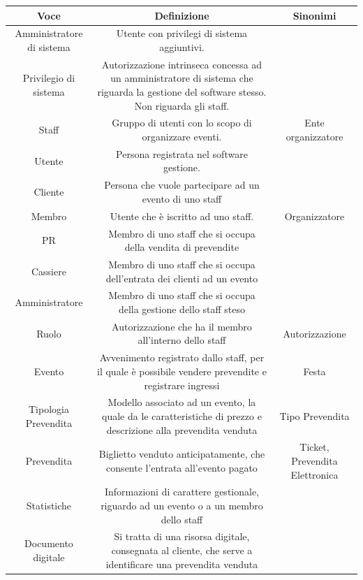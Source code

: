 \documentclass[a4paper]{article}
\begin{document}
\begin{table}[ht!]
  \begin{center}
    \begin{tabulary}{1\textwidth}{|c|C|C|}
        \hline
        \textbf{Voce} & \textbf{Definizione} & \textbf{Sinonimi}\\
        \hline
        \hline
		Amministratore di sistema & Utente con privilegi di sistema aggiuntivi. & \\
		\hline
		Privilegio di sistema & Autorizzazione intrinseca concessa ad un amministratore di sistema che riguarda la gestione del software stesso. Non riguarda gli staff. & \\
		\hline
        Staff & Gruppo di utenti con lo scopo di organizzare eventi. & Ente organizzatore \\
        \hline
        Utente & Persona registrata nel software gestione. & \\
        \hline
		Cliente & Persona che vuole partecipare ad un evento di uno staff & \\
		\hline
        Membro & Utente che è iscritto ad uno staff. & Organizzatore \\
        \hline
		PR & Membro di uno staff che si occupa della vendita di prevendite & \\
		\hline
		Cassiere & Membro di uno staff che si occupa dell'entrata dei clienti ad un evento & \\
		\hline
		Amministratore & Membro di uno staff che si occupa della gestione dello staff steso & \\
		\hline
        Ruolo & Autorizzazione che ha il membro all'interno dello staff & Autorizzazione \\
        \hline
        Evento & Avvenimento registrato dallo staff, per il quale è possibile vendere prevendite e registrare ingressi & Festa \\
        \hline
        Tipologia Prevendita & Modello associato ad un evento, la quale da le caratteristiche di prezzo e descrizione alla prevendita venduta & Tipo Prevendita \\
        \hline
        Prevendita & Biglietto venduto anticipatamente, che consente l'entrata all'evento pagato & Ticket, Prevendita Elettronica \\
        \hline
		Statistiche & Informazioni di carattere gestionale, riguardo ad un evento o a un membro dello staff & \\
		\hline
		Documento digitale & Si tratta di una risorsa digitale, consegnata al cliente, che serve a identificare una prevendita venduta & \\

\end{tabulary}
\end{center}
\end{table}
\end{document}
